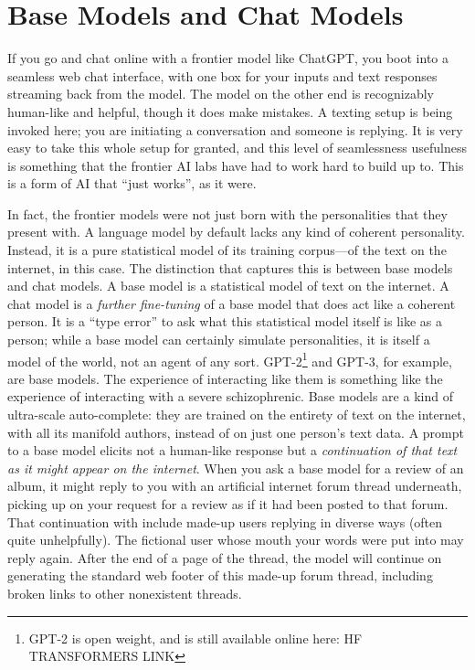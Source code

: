 \section{Base Models and Chat Models}
If you go and chat online with a frontier model like ChatGPT, you boot into a
seamless web chat interface, with one box for your inputs and text responses
streaming back from the model. The model on the other end is recognizably
human-like and helpful, though it does make mistakes. A texting setup is being
invoked here; you are initiating a conversation and someone is replying. It is
very easy to take this whole setup for granted, and this level of seamlessness
usefulness is something that the frontier AI labs have had to work hard to
build up to. This is a form of AI that ``just works'', as it were.

In fact, the frontier models were not just born with the personalities that
they present with. A language model by default lacks any kind of coherent
personality. Instead, it is a pure statistical model of its training
corpus---of the text on the internet, in this case. The distinction that
captures this is between base models and chat models. A base model is a
statistical model of text on the internet. A chat model is a \emph{further
fine-tuning} of a base model that does act like a coherent person. It is a
``type error'' to ask what this statistical model itself is like as a person;
while a base model can certainly simulate personalities, it is itself a model
of the world, not an agent of any sort. GPT-2\footnote{GPT-2 is open weight,
and is still available online here: HF TRANSFORMERS LINK} and GPT-3, for
example, are base models. The experience of interacting like them is something
like the experience of interacting with a severe schizophrenic. Base models are
a kind of ultra-scale auto-complete: they are trained on the entirety of text
on the internet, with all its manifold authors, instead of on just one person's
text data. A prompt to a base model elicits not a human-like response but a
\emph{continuation of that text as it might appear on the internet}. When you
ask a base model for a review of an album, it might reply to you with an
artificial internet forum thread underneath, picking up on your request for a
review as if it had been posted to that forum. That continuation with include
made-up users replying in diverse ways (often quite unhelpfully). The fictional
user whose mouth your words were put into may reply again. After the end of a
page of the thread, the model will continue on generating the standard web
footer of this made-up forum thread, including broken links to other
nonexistent threads.

